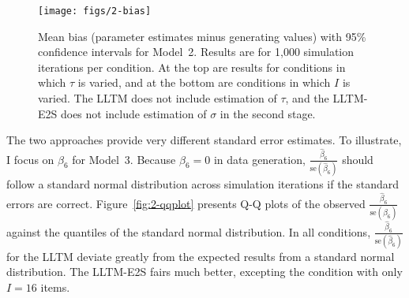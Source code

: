 \begin{figure}
	\centering
	\texttt{[image: figs/2-bias]}
	\caption{Mean bias (parameter estimates minus generating values) with 95\% confidence intervals for Model~2. Results are for 1,000 simulation iterations per condition. At the top are results for conditions in which $\tau$ is varied, and at the bottom are conditions in which $I$ is varied. The LLTM does not include estimation of $\tau$, and the LLTM-E2S does not include estimation of $\sigma$ in the second stage.}
	\label{fig:2-bias}
\end{figure}


%


The two approaches provide very different standard error estimates. To illustrate, I focus on $\beta_6$ for Model~3. Because $\beta_6 = 0$ in data generation,
$\frac{\hat \beta_6}{\mathrm{se}(\hat \beta_6)}$ 
should follow a standard normal distribution across simulation iterations if the standard errors are correct. 
Figure~\ref{fig:2-qqplot} presents Q-Q plots of the observed 
$\frac{\hat \beta_6}{\mathrm{se}(\hat \beta_6)}$ 
against the quantiles of the standard normal distribution. In all conditions, 
$\frac{\hat \beta_6}{\mathrm{se}(\hat \beta_6)}$ 
for the LLTM deviate greatly from the expected results from a standard normal distribution.
The LLTM-E2S fairs much better, excepting the condition with only $I=16$ items.

